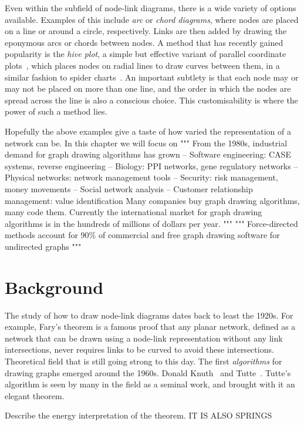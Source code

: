 Even within the subfield of node-link diagrams, there is a wide variety of options available.
Examples of this include \emph{arc} or \emph{chord diagrams}, where nodes are placed on a line or around a circle, respectively. Links are then added by drawing the eponymous arcs or chords between nodes.
A method that has recently gained popularity is the \emph{hive plot}, a simple but effective variant of parallel coordinate plots~\cite{TODO}, which places nodes on radial lines to draw curves between them, in a similar fashion to spider charts~\cite{TODO}. An important subtlety is that each node may or may not be placed on more than one line, and the order in which the nodes are spread across the line is also a conscious choice. This customisability is where the power of such a method lies.

Hopefully the above examples give a taste of how varied the representation of a network can be. In this chapter we will focus on 
"""
 From the 1980s, industrial demand for graph drawing algorithms has grown
– Software engineering: CASE systems, reverse engineering – Biology: PPI networks, gene regulatory networks
– Physical networks: network management tools
– Security: risk management, money movements
– Social network analysis
– Customer relationship management: value identification Many companies buy graph drawing algorithms, many code them.
Currently the international market for graph drawing algorithms is in the hundreds of millions of dollars per year.
"""
"""
Force-directed methods account for 90\% of commercial and free graph drawing software for undirected graphs
"""

\section{Background}
The study of how to draw node-link diagrams dates back to least the 1920s. For example, Fary's theorem is a famous proof that any planar network, defined as a network that can be drawn using a node-link representation without any link intersections, never requires links to be curved to avoid these intersections.
Theoretical field that is still going strong to this day.
The first \emph{algorithms} for drawing graphs emerged around the 1960s. Donald Knuth~\cite{TODO} and Tutte~\cite{TODO}.
Tutte's algorithm is seen by many in the field as a seminal work, and brought with it an elegant theorem.

Describe the energy interpretation of the theorem.
    IT IS ALSO SPRINGS

